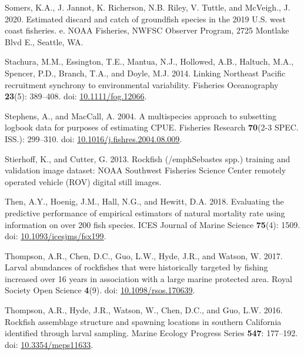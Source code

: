 \documentclass[11pt,
  english,
  a4paper,
]{article}
\newlength{\cslhangindent}
\newenvironment{CSLReferences}[2] %
 {%
  \setlength{\parindent}{0pt}
  \ifodd #1 \everypar{\setlength{\hangindent}{\cslhangindent}}\ignorespaces\fi
  \ifnum #2 > 0
  \setlength{\parskip}{#2\baselineskip}
  \fi
 }%
 {}
\begin{document}
\begin{CSLReferences}{1}{0}
\leavevmode{}%
Somers, K.A., J. Jannot, K. Richerson, N.B. Riley, V. Tuttle, and McVeigh., J. 2020. {Estimated discard and catch of groundfish species in the 2019 U.S. west coast fisheries. e}. NOAA Fisheries, NWFSC Observer Program, 2725 Montlake Blvd E., Seattle, WA.

\leavevmode{}%
Stachura, M.M., Essington, T.E., Mantua, N.J., Hollowed, A.B., Haltuch, M.A., Spencer, P.D., Branch, T.A., and Doyle, M.J. 2014. {Linking Northeast Pacific recruitment synchrony to environmental variability}. Fisheries Oceanography \textbf{23}(5): 389--408. doi: \href{https://doi.org/10.1111/fog.12066}{10.1111/fog.12066}.

\leavevmode{}%
Stephens, A., and MacCall, A. 2004. {A multispecies approach to subsetting logbook data for purposes of estimating CPUE}. Fisheries Research \textbf{70}(2-3 SPEC. ISS.): 299--310. doi: \href{https://doi.org/10.1016/j.fishres.2004.08.009}{10.1016/j.fishres.2004.08.009}.

\leavevmode{}%
Stierhoff, K., and Cutter, G. 2013. {Rockfish (/emph{Sebastes spp.}) training and validation image dataset: NOAA Southwest Fisheries Science Center remotely operated vehicle (ROV) digital still images.}

\leavevmode{}%
Then, A.Y., Hoenig, J.M., Hall, N.G., and Hewitt, D.A. 2018. {Evaluating the predictive performance of empirical estimators of natural mortality rate using information on over 200 fish species}. ICES Journal of Marine Science \textbf{75}(4): 1509. doi: \href{https://doi.org/10.1093/icesjms/fsx199}{10.1093/icesjms/fsx199}.

\leavevmode{}%
Thompson, A.R., Chen, D.C., Guo, L.W., Hyde, J.R., and Watson, W. 2017. {Larval abundances of rockfishes that were historically targeted by fishing increased over 16 years in association with a large marine protected area}. Royal Society Open Science \textbf{4}(9). doi: \href{https://doi.org/10.1098/rsos.170639}{10.1098/rsos.170639}.

\leavevmode{}%
Thompson, A.R., Hyde, J.R., Watson, W., Chen, D.C., and Guo, L.W. 2016. {Rockfish assemblage structure and spawning locations in southern California identified through larval sampling}. Marine Ecology Progress Series \textbf{547}: 177--192. doi: \href{https://doi.org/10.3354/meps11633}{10.3354/meps11633}.


\end{CSLReferences}
\end{document}
